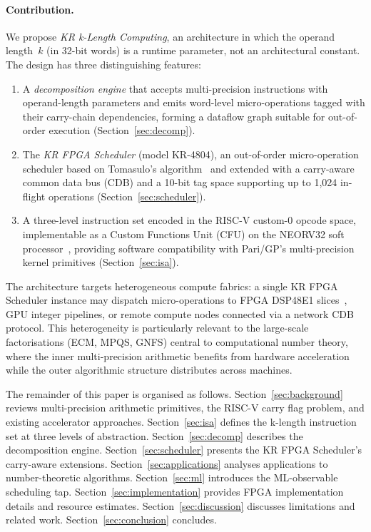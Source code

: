 \documentclass[11pt,a4paper]{article}
\begin{document}
\paragraph{Contribution.}
We propose \emph{KR k-Length Computing}, an architecture in which the operand
length~$k$ (in 32-bit words) is a runtime parameter, not an architectural
constant.  The design has three distinguishing features:

\begin{enumerate}[leftmargin=*]
  \item A \emph{decomposition engine} that accepts multi-precision instructions
    with operand-length parameters and emits word-level micro-operations tagged
    with their carry-chain dependencies, forming a dataflow graph suitable for
    out-of-order execution (Section~\ref{sec:decomp}).

  \item The \emph{KR FPGA Scheduler} (model KR-4804), an out-of-order micro-operation
    scheduler based on Tomasulo's algorithm~\cite{tomasulo1967} and extended
    with a carry-aware common data bus (CDB) and a 10-bit tag space supporting
    up to 1,024 in-flight operations (Section~\ref{sec:scheduler}).

  \item A three-level instruction set encoded in the RISC-V custom-0 opcode
    space, implementable as a Custom Functions Unit (CFU) on the NEORV32
    soft processor~\cite{neorv32ref}, providing software compatibility with
    Pari/GP's multi-precision kernel primitives (Section~\ref{sec:isa}).
\end{enumerate}

The architecture targets heterogeneous compute fabrics: a single KR FPGA
Scheduler instance may dispatch micro-operations to FPGA DSP48E1
slices~\cite{dsp48e1ug}, GPU integer pipelines, or remote compute nodes
connected via a network CDB protocol.  This heterogeneity is particularly
relevant to the large-scale factorisations (ECM, MPQS, GNFS) central to
computational number theory, where the inner multi-precision arithmetic
benefits from hardware acceleration while the outer algorithmic structure
distributes across machines.

The remainder of this paper is organised as follows.
Section~\ref{sec:background} reviews multi-precision arithmetic primitives,
the RISC-V carry flag problem, and existing accelerator approaches.
Section~\ref{sec:isa} defines the k-length instruction set at three levels of
abstraction.  Section~\ref{sec:decomp} describes the decomposition engine.
Section~\ref{sec:scheduler} presents the KR FPGA Scheduler's carry-aware
extensions.  Section~\ref{sec:applications} analyses applications to number-theoretic
algorithms.  Section~\ref{sec:ml} introduces the ML-observable scheduling tap.
Section~\ref{sec:implementation} provides FPGA implementation details and
resource estimates.  Section~\ref{sec:discussion} discusses limitations and
related work.  Section~\ref{sec:conclusion} concludes.
\end{document}
